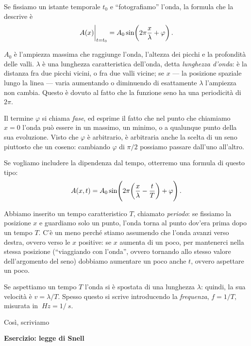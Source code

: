 \documentclass{article}
\begin{document}
Se fissiamo un istante temporale \(t_0 \) e ``fotografiamo'' l'onda, la formula che la descrive è 
%
\begin{align}
\eval{A(x)}_{t = t_0 } = A_0 \sin(2 \pi \frac{x}{\lambda } +\varphi )
\,.
\end{align}

\(A_0 \) è l'ampiezza massima che raggiunge l'onda, l'altezza dei picchi e la profondità delle valli. \(\lambda \) è una lunghezza caratteristica dell'onda, detta \emph{lunghezza d'onda}: è la distanza fra due picchi vicini, o fra due valli vicine; se \(x\) --- la posizione spaziale lungo la linea --- varia aumentando o diminuendo di esattamente \(\lambda\) l'ampiezza non cambia.
Questo è dovuto al fatto che la funzione seno ha una periodicità di \(2 \pi \). 

Il termine \(\varphi \) si chiama \emph{fase}, ed esprime il fatto che nel punto che chiamiamo \(x=0\) l'onda può essere in un massimo, un minimo, o a qualunque punto della sua evoluzione. 
Visto che \(\varphi \) è arbitrario, è arbitraria anche la scelta di un seno piuttosto che un coseno: cambiando \(\varphi \) di \(\pi /2\) possiamo passare dall'uno all'altro. 

Se vogliamo includere la dipendenza dal tempo, otterremo una formula di questo tipo: 
%
\begin{align}
A(x, t) = A_0 \sin(2 \pi \qty( \frac{x}{\lambda } - \frac{t}{T}) + \varphi )
\,.
\end{align}

Abbiamo inserito un tempo caratteristico \(T\), chiamato \emph{periodo}: se fissiamo la posizione \(x\) e guardiamo solo un punto, l'onda torna al punto dov'era prima dopo un tempo \(T\). 
C'è un meno perché stiamo assumendo che l'onda avanzi verso destra, ovvero verso le \(x\) positive: se \(x\) aumenta di un poco, per mantenerci nella stessa posizione (``viaggiando con l'onda'', ovvero tornando allo stesso valore dell'argomento del seno) dobbiamo aumentare un poco anche \(t\), ovvero aspettare un poco. 

Se aspettiamo un tempo \(T\) l'onda si è spostata di una lunghezza \(\lambda \): quindi, la sua velocità è \(v = \lambda / T\). Spesso questo si scrive introducendo la \emph{frequenza}, \(f = 1 / T\), misurata in \(\SI{}{Hz} = 1 / \SI{}{s}\).

Così, scriviamo 
%

\textbf{Esercizio: legge di Snell}
\end{document}
